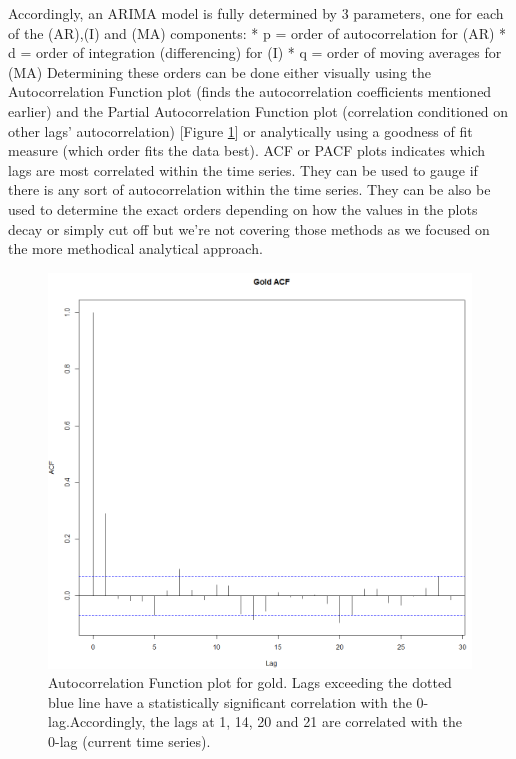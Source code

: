 Accordingly, an ARIMA model is fully determined by 3 parameters, one for each of the (AR),(I) and (MA) components: %
* p = order of autocorrelation for (AR)
* d = order of integration (differencing) for (I)
* q = order of moving averages for (MA)
Determining these orders can be done either visually using the Autocorrelation Function plot (finds the autocorrelation coefficients mentioned earlier) and the Partial Autocorrelation Function plot (correlation conditioned on other lags' autocorrelation) [Figure \ref{fig:ACF}] or analytically using a goodness of fit measure (which order fits the data best).
ACF or PACF plots indicates which lags are most correlated within the time series. They can be used to gauge if there is any sort of autocorrelation within the time series. They can be also be used to determine the exact orders depending on how the values in the plots decay or simply cut off but we're not covering those methods as we focused on the more methodical analytical approach.
\begin{figure}[ht]
	\vskip 0.2in
	\begin{center}
		\centerline{\includegraphics[width=\columnwidth]{ACF.png}}
		\caption{Autocorrelation Function plot for gold. Lags exceeding the dotted blue line have a statistically significant correlation with the 0-lag.Accordingly, the lags at 1, 14, 20 and 21 are correlated with the 0-lag (current time series).}
	\end{center}
	\vskip -0.2in
	\label{fig:ACF}
\end{figure}
